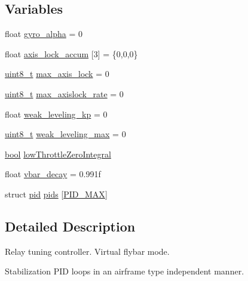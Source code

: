 \subsection*{Variables}
\begin{DoxyCompactItemize}
\item 
float \hyperlink{group___stabilization_module_gaf51ebd613903cfff91be0878961b04cf}{gyro\-\_\-alpha} = 0
\item 
float \hyperlink{group___stabilization_module_ga1b6fc01b4acff35c8b4875e91fb63bce}{axis\-\_\-lock\-\_\-accum} \mbox{[}3\mbox{]} = \{0,0,0\}
\item 
\hyperlink{stdint_8h_aba7bc1797add20fe3efdf37ced1182c5}{uint8\-\_\-t} \hyperlink{group___stabilization_module_ga9d12f9314c47dcc57be19ca03b5ac09a}{max\-\_\-axis\-\_\-lock} = 0
\item 
\hyperlink{stdint_8h_aba7bc1797add20fe3efdf37ced1182c5}{uint8\-\_\-t} \hyperlink{group___stabilization_module_ga94dd677918bcbe2c1ee026d1c1f95fd1}{max\-\_\-axislock\-\_\-rate} = 0
\item 
float \hyperlink{group___stabilization_module_ga0ed1377fcc1a59ba76172e76b113704d}{weak\-\_\-leveling\-\_\-kp} = 0
\item 
\hyperlink{stdint_8h_aba7bc1797add20fe3efdf37ced1182c5}{uint8\-\_\-t} \hyperlink{group___stabilization_module_gac1659053cf18ba9ead672d2795fb6941}{weak\-\_\-leveling\-\_\-max} = 0
\item 
\hyperlink{group___exported__types_gaf6a258d8f3ee5206d682d799316314b1}{bool} \hyperlink{group___stabilization_module_gaf67afab9d5822cab800d87ee04512e53}{low\-Throttle\-Zero\-Integral}
\item 
float \hyperlink{group___stabilization_module_ga953d14b1e6e45afc361e0898296bf346}{vbar\-\_\-decay} = 0.\-991f
\item 
struct \hyperlink{structpid}{pid} \hyperlink{group___stabilization_module_ga1b7c75ff9222444babfe603f25b91233}{pids} \mbox{[}\hyperlink{group___stabilization_module_gga726ca809ffd3d67ab4b8476646f26635aa9ba8c316889eca7f244f9e458323e1c}{P\-I\-D\-\_\-\-M\-A\-X}\mbox{]}
\end{DoxyCompactItemize}


\subsection{Detailed Description}
Relay tuning controller. Virtual flybar mode.

Stabilization P\-I\-D loops in an airframe type independent manner.

